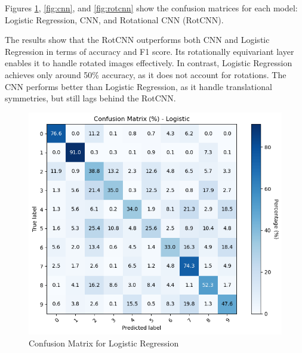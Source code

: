 \documentclass[12pt]{article}
\begin{document}
Figures \ref{fig:log_reg}, \ref{fig:cnn}, and \ref{fig:rotcnn} show the confusion matrices for each model: Logistic Regression, CNN, and Rotational CNN (RotCNN). 

The results show that the RotCNN outperforms both CNN and Logistic Regression in terms of accuracy and F1 score. Its rotationally equivariant layer enables it to handle rotated images effectively. In contrast, Logistic Regression achieves only around 50\% accuracy, as it does not account for rotations. The CNN performs better than Logistic Regression, as it handle translational symmetries, but still lags behind the RotCNN.

\begin{figure}[H]
    \centering
    \includegraphics[width=1.0\textwidth]{pics/logtest.png}
    \caption{Confusion Matrix for Logistic Regression}
    \label{fig:log_reg}
\end{figure}
\end{document}
